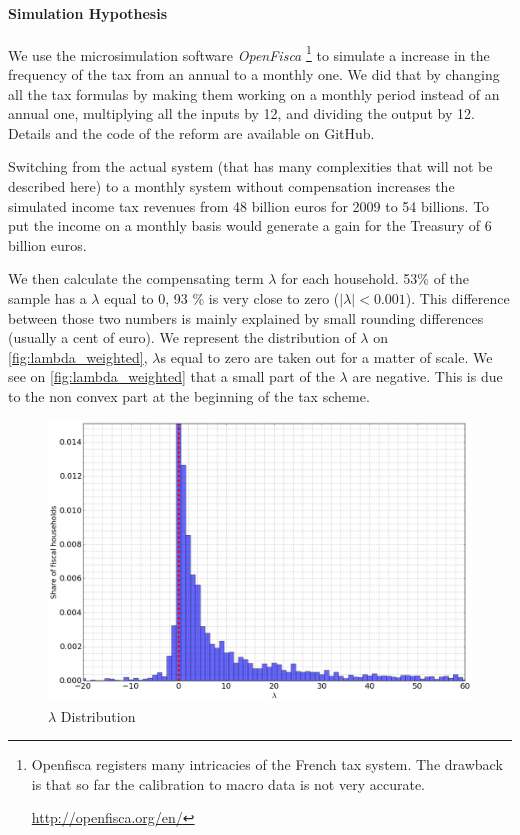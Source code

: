\paragraph{Simulation Hypothesis}

We use the microsimulation software \emph{OpenFisca} \footnote{Openfisca
registers many intricacies of the French tax system. The drawback is that so
far the calibration to macro data is not very accurate.
\par
\url{http://openfisca.org/en/} } to simulate a increase in the frequency of the tax from an annual to a
monthly one. We did that by changing all the tax formulas by making them
working on a monthly period instead of an annual one, multiplying all the
inputs by 12, and dividing the output by 12. Details and the code of the
reform are available on GitHub.

Switching from the actual system (that has many complexities that will not be
described here) to a monthly system without compensation increases the
simulated income tax revenues from 48 billion euros for 2009 to 54 billions.
To put the income on a monthly basis would generate a gain for the Treasury of
6 billion euros.

We then calculate the compensating term $\lambda$ for each household. 53\% of
the sample has a $\lambda$ equal to 0, 93 \% is very close to zero
($\mid\lambda\mid<0.001$). This difference between those two numbers is mainly
explained by small rounding differences (usually a cent of euro). We represent
the distribution of $\lambda$ on \autoref{fig:lambda_weighted}, $\lambda$s
equal to zero are taken out for a matter of scale. We see on
\autoref{fig:lambda_weighted} that a small part of the $\lambda$ are negative.
This is due to the non convex part at the beginning of the tax scheme.

\begin{figure}
\caption{$\lambda$ Distribution }%
\label{fig:lambda_weighted}
\par
\begin{center}
\includegraphics[width=\textwidth]{lambda_weighted.png}
\end{center}
\end{figure}

